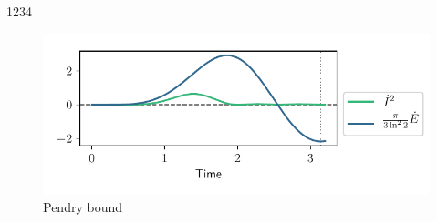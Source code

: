 \documentclass{book}
\numberwithin{equation}{section} %
\begin{document}
1234
\begin{figure}[h!]
    \centering
    \includegraphics{alltheplots/corr_at_diff_pos-new-alpha/12_pendry_grey_lines.pdf}
    \caption{Pendry bound \cite{BA_Pendry_1983}}
    \label{fig:corr12_pendry}
\end{figure}\\
\end{document}
